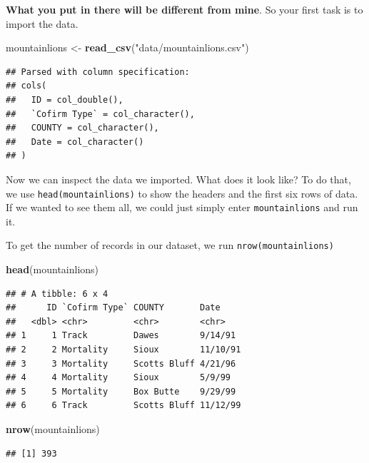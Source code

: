 \documentclass[]{book}
\newenvironment{Shaded}{\begin{snugshade}}{\end{snugshade}}
\newcommand{\KeywordTok}[1]{\textcolor[rgb]{0.13,0.29,0.53}{\textbf{#1}}}
\newcommand{\StringTok}[1]{\textcolor[rgb]{0.31,0.60,0.02}{#1}}
\newcommand{\NormalTok}[1]{#1}
\begin{document}
\textbf{What you put in there will be different from mine}. So your
first task is to import the data.

\begin{Shaded}
\begin{Highlighting}[]
\NormalTok{mountainlions <-}\StringTok{ }\KeywordTok{read_csv}\NormalTok{(}\StringTok{"data/mountainlions.csv"}\NormalTok{)}
\end{Highlighting}
\end{Shaded}

\begin{verbatim}
## Parsed with column specification:
## cols(
##   ID = col_double(),
##   `Cofirm Type` = col_character(),
##   COUNTY = col_character(),
##   Date = col_character()
## )
\end{verbatim}

Now we can inspect the data we imported. What does it look like? To do
that, we use \texttt{head(mountainlions)} to show the headers and the
first six rows of data. If we wanted to see them all, we could just
simply enter \texttt{mountainlions} and run it.

To get the number of records in our dataset, we run
\texttt{nrow(mountainlions)}

\begin{Shaded}
\begin{Highlighting}[]
\KeywordTok{head}\NormalTok{(mountainlions)}
\end{Highlighting}
\end{Shaded}

\begin{verbatim}
## # A tibble: 6 x 4
##      ID `Cofirm Type` COUNTY       Date    
##   <dbl> <chr>         <chr>        <chr>   
## 1     1 Track         Dawes        9/14/91 
## 2     2 Mortality     Sioux        11/10/91
## 3     3 Mortality     Scotts Bluff 4/21/96 
## 4     4 Mortality     Sioux        5/9/99  
## 5     5 Mortality     Box Butte    9/29/99 
## 6     6 Track         Scotts Bluff 11/12/99
\end{verbatim}

\begin{Shaded}
\begin{Highlighting}[]
\KeywordTok{nrow}\NormalTok{(mountainlions)}
\end{Highlighting}
\end{Shaded}

\begin{verbatim}
## [1] 393
\end{verbatim}
\end{document}
